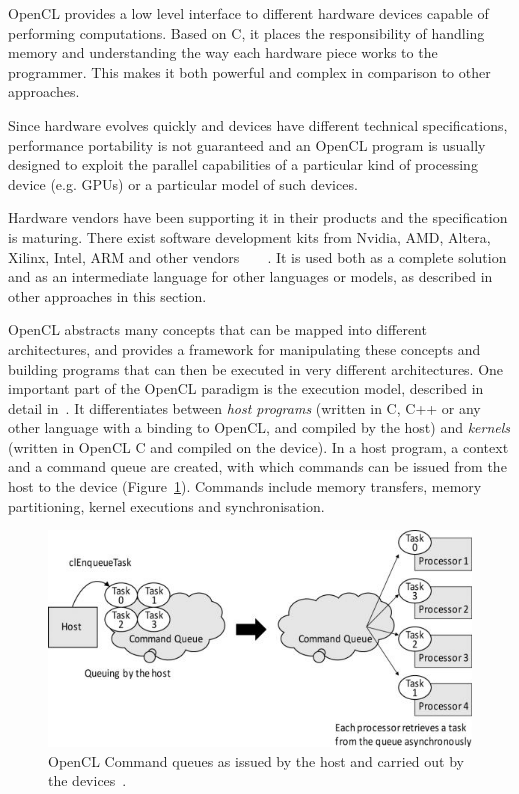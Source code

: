 OpenCL provides a low level interface to different hardware devices capable of performing computations. Based on C, it places the responsibility of handling memory and understanding the way each hardware piece works to the programmer. This makes it both powerful and complex in comparison to other approaches. 

Since hardware evolves quickly and devices have different technical specifications, performance portability is not guaranteed and an OpenCL program is usually designed to exploit the parallel capabilities of a particular kind of processing device (e.g. GPUs) or a particular model of such devices.

Hardware vendors have been supporting it in their products and the specification is maturing. There exist software development kits from Nvidia, AMD, Altera, Xilinx, Intel, ARM and other vendors~\cite{tsuchiyama2010opencl}~\cite{6_wikipedia_2015}~\cite{tsuchiyama2010opencl}~\cite{singh2011implementing}. It is used both as a complete solution and as an intermediate language for other languages or models, as described in other approaches in this section.

OpenCL abstracts many concepts that can be mapped into different architectures, and provides a framework for manipulating these concepts and building programs that can then be executed in very different architectures. One important part of the OpenCL paradigm is the execution model, described in detail in~\cite{khronos44opencl}. It differentiates between \textit{host programs} (written in C, C++ or any other language with a binding to OpenCL, and compiled by the host) and \textit{kernels} (written in OpenCL C and compiled on the device). In a host program, a context and a command queue are created, with which commands can be issued from the host to the device (Figure~\ref{f:enqueue}). Commands include memory transfers, memory partitioning, kernel executions and synchronisation.

\begin{figure}[!h]
\begin{center}
\centerline{\includegraphics{img/enqueue}}
\caption[OpenCL Command queues as issued by the host and carried out by the devices.]{OpenCL Command queues as issued by the host and carried out by the devices~\cite{tsuchiyama2010opencl}.}
\label{f:enqueue}
\end{center}
\end{figure}

